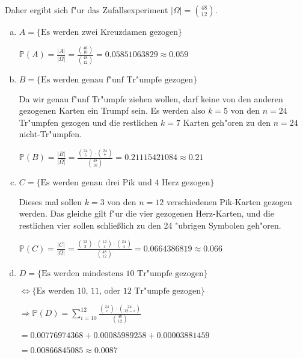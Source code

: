 \documentclass[a4paper,12pt]{article}
\begin{document}
    Daher ergibt sich f"ur das Zufallsexperiment $ |\Omega| = \binom{48}{12} $.
    \begin{enumerate}[(a)]
        \item
        $ A = \{\text{Es werden zwei Kreuzdamen gezogen}\} $


        $ \displaystyle \mathbb{P}(A) = \frac{|A|}{|\Omega|} = \frac{\binom{46}{10}}{\binom{48}{12}} = 0.05851063829 \approx 0.059 $

        \item
        $ B = \{\text{Es werden genau f"unf Tr"umpfe gezogen}\} $ 

        Da wir genau f"unf Tr"umpfe ziehen wollen, darf keine von den anderen gezogenen Karten ein Trumpf sein.
        Es werden also $ k = 5 $ von den $ n = 24 $ Tr"umpfen gezogen und die restlichen $ k = 7 $ Karten geh"oren zu den $ n = 24 $ nicht-Tr"umpfen.

        $ \displaystyle \mathbb{P}(B) = \frac{|B|}{|\Omega|} = \frac{\binom{24}{5} \cdot \binom{24}{7}}{\binom{48}{10}} = 0.21115421084 \approx 0.21 $
        
        \item
        $ C = \{\text{Es werden genau drei Pik und 4 Herz gezogen}\} $

        Dieses mal sollen $ k = 3 $ von den $ n = 12 $ verschiedenen Pik-Karten gezogen werden. 
        Das gleiche gilt f"ur die vier gezogenen Herz-Karten, und die restlichen vier sollen schlie\ss lich zu den 24 "ubrigen Symbolen geh"oren.

        $ \displaystyle \mathbb{P}(C) = \frac{|C|}{|\Omega|} = \frac{\binom{12}{3} \cdot \binom{12}{4} \cdot \binom{24}{4}}{\binom{48}{12}} = 0.0664386819 \approx 0.066 $ 

        \item
        $ D = \{\text{Es werden mindestens 10 Tr"umpfe gezogen}\} $

        $ \Leftrightarrow \{\text{Es werden 10, 11, oder 12 Tr"umpfe gezogen}\} $

        $ \Rightarrow \displaystyle \mathbb{P}(D) = \sum_{i = 10}^{12}\frac{\binom{24}{i} \cdot \binom{24}{12-i}}{\binom{48}{12}} $ 

        $ = 0.00776974368 + 0.00085989258 + 0.00003881459 $

        $ = 0.00866845085 \approx 0.0087 $


\end{enumerate}
\end{document}
